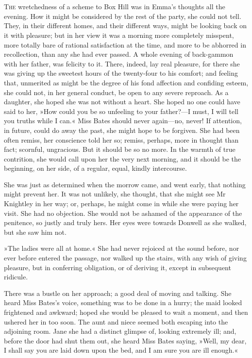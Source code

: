 \chapter[Chapter \thechapter]{}
\lettrine[lines=4,lraise=0.3]{T}{he} wretchedness of a scheme to Box Hill was in Emma's thoughts all the evening. How it might be considered by the rest of the party, she could not tell. They, in their different homes, and their different ways, might be looking back on it with pleasure; but in her view it was a morning more completely misspent, more totally bare of rational satisfaction at the time, and more to be abhorred in recollection, than any she had ever passed. A whole evening of back-gammon with her father, was felicity to it. There, indeed, lay real pleasure, for there she was giving up the sweetest hours of the twenty-four to his comfort; and feeling that, unmerited as might be the degree of his fond affection and confiding esteem, she could not, in her general conduct, be open to any severe reproach. As a daughter, she hoped she was not without a heart. She hoped no one could have said to her, »How could you be so unfeeling to your father?—I must, I will tell you truths while I can.« Miss Bates should never again—no, never! If attention, in future, could do away the past, she might hope to be forgiven. She had been often remiss, her conscience told her so; remiss, perhaps, more in thought than fact; scornful, ungracious. But it should be so no more. In the warmth of true contrition, she would call upon her the very next morning, and it should be the beginning, on her side, of a regular, equal, kindly intercourse.

She was just as determined when the morrow came, and went early, that nothing might prevent her. It was not unlikely, she thought, that she might see Mr Knightley in her way; or, perhaps, he might come in while she were paying her visit. She had no objection. She would not be ashamed of the appearance of the penitence, so justly and truly hers. Her eyes were towards Donwell as she walked, but she saw him not.

»The ladies were all at home.« She had never rejoiced at the sound before, nor ever before entered the passage, nor walked up the stairs, with any wish of giving pleasure, but in conferring obligation, or of deriving it, except in subsequent ridicule.

There was a bustle on her approach; a good deal of moving and talking. She heard Miss Bates's voice, something was to be done in a hurry; the maid looked frightened and awkward; hoped she would be pleased to wait a moment, and then ushered her in too soon. The aunt and niece seemed both escaping into the adjoining room. Jane she had a distinct glimpse of, looking extremely ill; and, before the door had shut them out, she heard Miss Bates saying, »Well, my dear, I shall say you are laid down upon the bed, and I am sure you are ill enough.«

